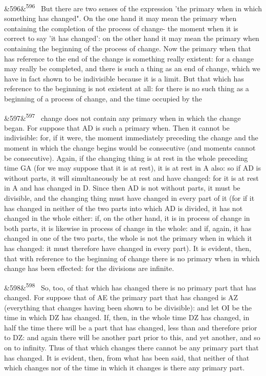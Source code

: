 \documentclass[12pt]{article}
\newcommand{\para}[1][]{\par\noindent\ifx&#1&\else\textsuperscript{\footnotesize #1}~\fi}
\begin{document}
\para[596] But there are two senses of the expression 'the primary when in which something has changed". On the one hand it may mean the primary when containing the completion of the process of change- the moment when it is correct to say 'it has changed’: on the other hand it may mean the primary when containing the beginning of the process of change. Now the primary when that has reference to the end of the change is something really existent: for a change may really be completed, and there is such a thing as an end of change, which we have in fact shown to be indivisible because it is a limit. But that which has reference to the beginning is not existent at all: for there is no such thing as a beginning of a process of change, and the time occupied by the

\para[597] change does not contain any primary when in which the change began. For suppose that AD is such a primary when. Then it cannot be indivisible: for, if it were, the moment immediately preceding the change and the moment in which the change begins would be consecutive (and moments cannot be consecutive). Again, if the changing thing is at rest in the whole preceding time GA (for we may suppose that it is at rest), it is at rest in A also: so if AD is without parts, it will simultaneously be at rest and have changed: for it is at rest in A and has changed in D. Since then AD is not without parts, it must be divisible, and the changing thing must have changed in every part of it (for if it has changed in neither of the two parts into which AD is divided, it has not changed in the whole either: if, on the other hand, it is in process of change in both parts, it is likewise in process of change in the whole: and if, again, it has changed in one of the two parts, the whole is not the primary when in which it has changed: it must therefore have changed in every part). It is evident, then, that with reference to the beginning of change there is no primary when in which change has been effected: for the divisions are infinite.

\para[598] So, too, of that which has changed there is no primary part that has changed. For suppose that of AE the primary part that has changed is AZ (everything that changes having been shown to be divisible): and let OI be the time in which DZ has changed. If, then, in the whole time DZ has changed, in half the time there will be a part that has changed, less than and therefore prior to DZ: and again there will be another part prior to this, and yet another, and so on to infinity. Thus of that which changes there cannot be any primary part that has changed. It is evident, then, from what has been said, that neither of that which changes nor of the time in which it changes is there any primary part.
\end{document}
